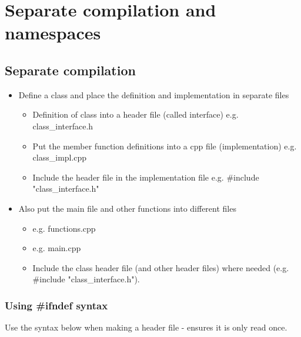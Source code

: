 \section{Separate compilation and namespaces}

\subsection{Separate compilation}

\begin{itemize}
	\item Define a class and place the definition and implementation in separate files
	\begin{itemize}
		\item Definition of class into a header file (called interface) e.g. class\_interface.h
		\item Put the member function definitions into a cpp file (implementation) e.g.
		class\_impl.cpp
		\item Include the header file in the implementation file e.g.
		\#include "class\_interface.h"
	\end{itemize}
	\item Also put the main file and other functions into different files
	\begin{itemize}
		\item e.g. functions.cpp
		\item	e.g. main.cpp
		\item Include the class header file (and other header files) where needed (e.g.
		\#include "class\_interface.h").
	\end{itemize}
\end{itemize}

\subsubsection*{Using \#ifndef syntax}
Use the syntax below when making a header file - ensures it is only read once.






